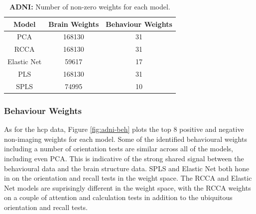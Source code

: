 \begin{table}
    \centering
    \caption{\textbf{ADNI:} Number of non-zero \gls{weights} for each model.}
    \begin{tabular}{|c|c|c|}
        \hline
        Model       & Brain Weights & Behaviour Weights \\
        \hline
        PCA         & 168130        & 31                \\
        RCCA        & 168130        & 31                \\
        Elastic Net & 59617         & 17                \\
        PLS         & 168130        & 31                \\
        SPLS        & 74995         & 10                \\
        \hline
    \end{tabular}\label{tab:brain-behaviour-weights-adni}
\end{table}

\subsubsection{Behaviour Weights}

As for the \acrshort{hcp} data, Figure \ref{fig:adni-beh} plots the top 8 positive and negative non-imaging \gls{weights} for each model.
Some of the identified behavioural \gls{weights} including a number of orientation tests are similar across all of the models, including even PCA.
This is indicative of the strong shared signal between the behavioural data and the brain structure data.
SPLS and Elastic Net both hone in on the orientation and recall tests in the weight space.
The RCCA and Elastic Net models are suprisingly different in the weight space, with the RCCA \gls{weights} on a couple of attention and calculation tests in addition to the ubiquitous orientation and recall tests.

